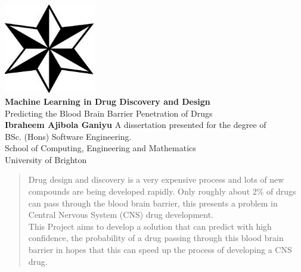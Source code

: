 \documentclass[a4paper,12pt]{report}
\begin{document}
\begin{titlepage}
	\begin{center}
		\includegraphics[scale=1,width=0.3\textwidth]{images/uob_logo} \\
		\huge
		\textbf{Machine Learning in Drug Discovery and Design\\}
		\vspace{0.5cm}
		\Large
		Predicting the Blood Brain Barrier Penetration of Drugs \\
		\vspace{1.5cm}
		\textbf{Ibraheem Ajibola Ganiyu}
		\vfill
		A dissertation presented for the degree of \\
		BSc. (Hons) Software Engineering. \\
		\vspace{0.8cm}
		\large
		School of Computing, Engineering and Mathematics \\
		University of Brighton \\
		\date{\today}
	\end{center}
\end{titlepage}

\tableofcontents
\newpage
\listoffigures
\listoftables
\listoflistings
\newpage
{}


\begin{abstract}
	Drug design and discovery is a very expensive process and lots of new compounds are being developed rapidly. Only roughly about 2\% of drugs can pass through the blood brain barrier, this presents a problem in Central Nervous System (CNS) drug development. \\
	This Project aims to develop a solution that can predict with high confidence, the probability of a drug passing through this blood brain barrier in hopes that this can speed up the process of developing a CNS drug.
\end{abstract}
\end{document}
